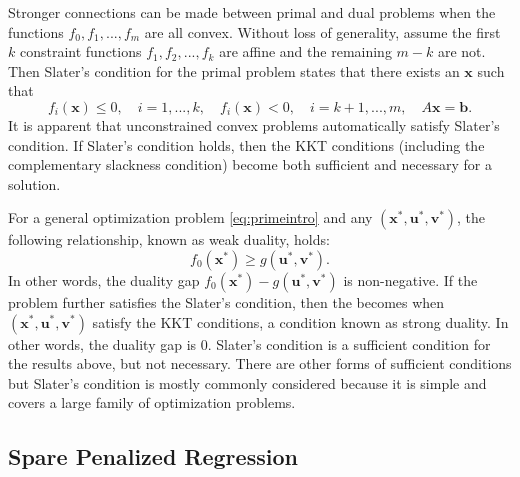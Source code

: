 Stronger connections can be made between primal and dual problems when the functions $f_0,f_1,...,f_m$ are all convex. Without loss of generality, assume the first $k$ constraint functions $f_1,f_2,...,f_k$ are affine and the remaining $m-k$ are not. Then Slater's condition for the primal problem states that there exists an $\boldsymbol x$ such that
\begin{equation}
    f_i(\boldsymbol x)\leq 0,\quad i=1,...,k,\quad f_i(\boldsymbol x)<0,\quad i=k+1,...,m,\quad A\boldsymbol x= \boldsymbol b.
\end{equation}
It is apparent that unconstrained convex problems automatically satisfy Slater's condition. If Slater's condition holds, then the KKT conditions (including the complementary slackness condition) become both sufficient and necessary for a solution. 

For a general optimization problem \eqref{eq:primeintro} and any $(\boldsymbol x^*,\boldsymbol u^*,\boldsymbol v^*)$, the following relationship, known as weak duality, holds:
\begin{equation}
    f_0(\boldsymbol x^*)\geq g(\boldsymbol u^*,\boldsymbol v^*).
\end{equation}
In other words, the duality gap $f_0(\boldsymbol x^*)-g(\boldsymbol u^*,\boldsymbol v^*)$ is non-negative. If the problem further satisfies the Slater's condition, then the \quotes{$\geq$} becomes \quotes{$=$} when $(\boldsymbol x^*,\boldsymbol u^*,\boldsymbol v^*)$ satisfy the KKT conditions, a condition known as strong duality. In other words, the duality gap is $0$. Slater's condition is a sufficient condition for the results above, but not necessary. There are other forms of sufficient conditions but Slater's condition is mostly commonly considered because it is simple and covers a large family of optimization problems. 

\subsection{Spare Penalized Regression}

